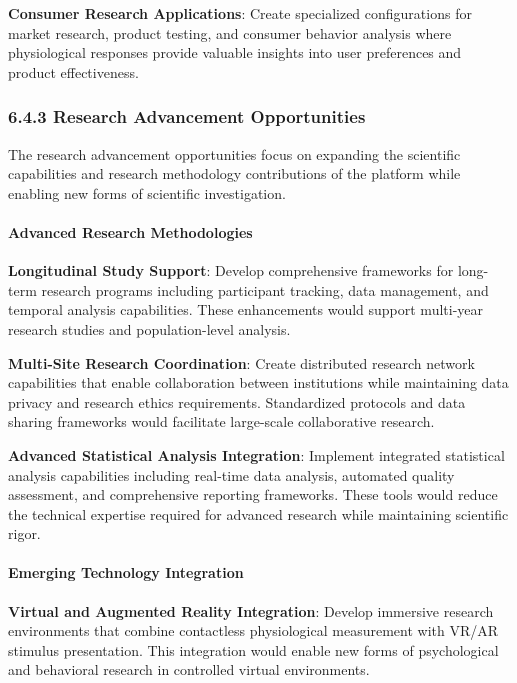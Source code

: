 \documentclass[12pt,a4paper]{article}
\begin{document}
\textbf{Consumer Research Applications}: Create specialized configurations for market research, product testing, and consumer
behavior analysis where physiological responses provide valuable insights into user preferences and product
effectiveness.

\subsubsection{6.4.3 Research Advancement Opportunities}

The research advancement opportunities focus on expanding the scientific capabilities and research methodology
contributions of the platform while enabling new forms of scientific investigation.

\paragraph{Advanced Research Methodologies}

\textbf{Longitudinal Study Support}: Develop comprehensive frameworks for long-term research programs including participant
tracking, data management, and temporal analysis capabilities. These enhancements would support multi-year research
studies and population-level analysis.

\textbf{Multi-Site Research Coordination}: Create distributed research network capabilities that enable collaboration between
institutions while maintaining data privacy and research ethics requirements. Standardized protocols and data sharing
frameworks would facilitate large-scale collaborative research.

\textbf{Advanced Statistical Analysis Integration}: Implement integrated statistical analysis capabilities including
real-time data analysis, automated quality assessment, and comprehensive reporting frameworks. These tools would reduce
the technical expertise required for advanced research while maintaining scientific rigor.

\paragraph{Emerging Technology Integration}

\textbf{Virtual and Augmented Reality Integration}: Develop immersive research environments that combine contactless
physiological measurement with VR/AR stimulus presentation. This integration would enable new forms of psychological and
behavioral research in controlled virtual environments.
\end{document}

